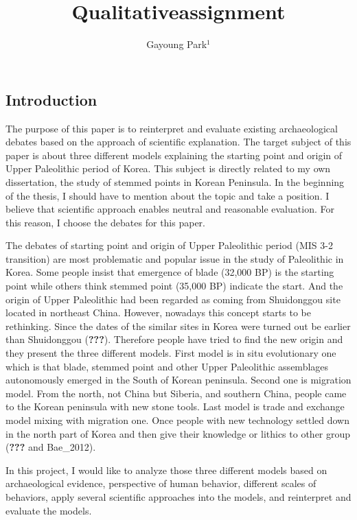 \documentclass[american,man]{apa6}
\title{Qualitativeassignment}
\author{Gayoung Park\(^1\)}
\affiliation{\vspace{0.5cm}\(^1\)University of Washington}
\begin{document}
\maketitle

\subsection{Introduction}\label{introduction}

The purpose of this paper is to reinterpret and evaluate existing
archaeological debates based on the approach of scientific explanation.
The target subject of this paper is about three different models
explaining the starting point and origin of Upper Paleolithic period of
Korea. This subject is directly related to my own dissertation, the
study of stemmed points in Korean Peninsula. In the beginning of the
thesis, I should have to mention about the topic and take a position. I
believe that scientific approach enables neutral and reasonable
evaluation. For this reason, I choose the debates for this paper.

The debates of starting point and origin of Upper Paleolithic period
(MIS 3-2 transition) are most problematic and popular issue in the study
of Paleolithic in Korea. Some people insist that emergence of blade
(32,000 BP) is the starting point while others think stemmed point
(35,000 BP) indicate the start. And the origin of Upper Paleolithic had
been regarded as coming from Shuidonggou site located in northeast
China. However, nowadays this concept starts to be rethinking. Since the
dates of the similar sites in Korea were turned out be earlier than
Shuidonggou ({\textbf{???}}). Therefore people have tried to find the
new origin and they present the three different models. First model is
in situ evolutionary one which is that blade, stemmed point and other
Upper Paleolithic assemblages autonomously emerged in the South of
Korean peninsula. Second one is migration model. From the north, not
China but Siberia, and southern China, people came to the Korean
peninsula with new stone tools. Last model is trade and exchange model
mixing with migration one. Once people with new technology settled down
in the north part of Korea and then give their knowledge or lithics to
other group ({\textbf{???}} and Bae\_2012).

In this project, I would like to analyze those three different models
based on archaeological evidence, perspective of human behavior,
different scales of behaviors, apply several scientific approaches into
the models, and reinterpret and evaluate the models.
\end{document}

